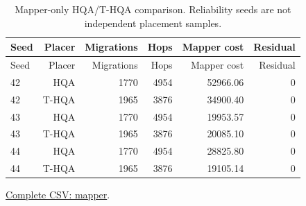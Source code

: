 \begin{center}\small
\begin{longtable}{lrrrrr}
\caption{Mapper-only HQA/T-HQA comparison. Reliability seeds are not independent placement samples.}\\
\toprule
Seed & Placer & Migrations & Hops & Mapper cost & Residual \\
\midrule\endfirsthead
\toprule
Seed & Placer & Migrations & Hops & Mapper cost & Residual \\
\midrule\endhead
42 & HQA & 1770 & 4954 & 52966.06 & 0 \\
42 & T-HQA & 1965 & 3876 & 34900.40 & 0 \\
43 & HQA & 1770 & 4954 & 19953.57 & 0 \\
43 & T-HQA & 1965 & 3876 & 20085.10 & 0 \\
44 & HQA & 1770 & 4954 & 28825.80 & 0 \\
44 & T-HQA & 1965 & 3876 & 19105.14 & 0 \\
\bottomrule\end{longtable}\end{center}
{\footnotesize \href{https://github.com/sanjeevkrishnaa/Compiler-Driven-ACE/blob/codex/ace-scheduler-correctness/docs/latex/oct25_pre_golden/data/mapper.csv}{Complete CSV: mapper}. }
